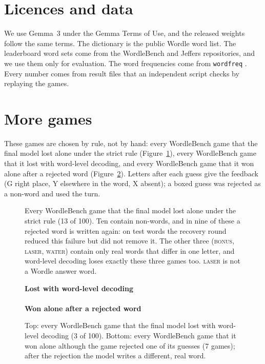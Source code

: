 \documentclass{article}
\begin{document}
\section{Licences and data}
We use Gemma~3 under the Gemma Terms of Use, and the released weights follow the same terms. The dictionary is the public Wordle word list. The leaderboard word sets come from the WordleBench and Jeffers repositories, and we use them only for evaluation. The word frequencies come from \texttt{wordfreq} \citep{speer2022wordfreq}. Every number comes from result files that an independent script checks by replaying the games.

\section{More games}
\label{app:games}
These games are chosen by rule, not by hand: every WordleBench game that the final model lost alone under the strict rule (Figure~\ref{fig:gal-alone}), every WordleBench game that it lost with word-level decoding, and every WordleBench game that it won alone after a rejected word (Figure~\ref{fig:gal-word}). Letters after each guess give the feedback (G right place, Y elsewhere in the word, X absent); a boxed guess was rejected as a non-word and used the turn.

\begin{figure}[htbp]
\centering\small

\caption{Every WordleBench game that the final model lost alone under the strict rule (13 of 100). Ten contain non-words, and in nine of these a rejected word is written again: on test words the recovery round reduced this failure but did not remove it. The other three (\textsc{bonus}, \textsc{laser}, \textsc{water}) contain only real words that differ in one letter, and word-level decoding loses exactly these three games too. \textsc{laser} is not a Wordle answer word.}
\label{fig:gal-alone}
\end{figure}

\begin{figure}[htbp]
\centering\small
\textbf{Lost with word-level decoding}\\[4pt]

\\[10pt]
\textbf{Won alone after a rejected word}\\[4pt]

\caption{Top: every WordleBench game that the final model lost with word-level decoding (3 of 100). Bottom: every WordleBench game that it won alone although the game rejected one of its guesses (7 games); after the rejection the model writes a different, real word.}
\label{fig:gal-word}
\end{figure}
\end{document}

